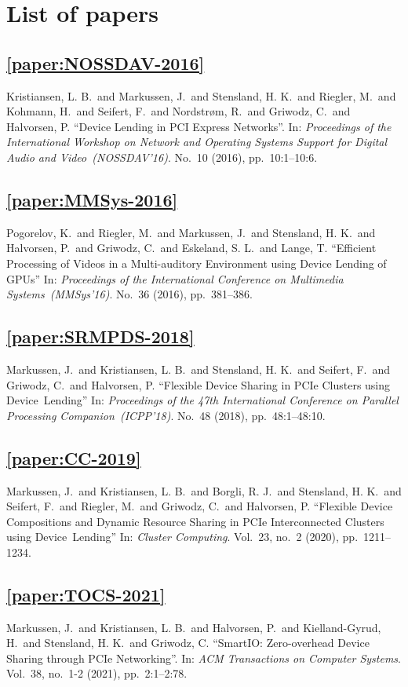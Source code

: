 \chapter{List of papers}

\section*{\cref{paper:NOSSDAV-2016}}
Kristiansen, L. B.\ and Markussen, J.\ and Stensland, H. K.\ and Riegler, M.\ and Kohmann, H.\ and Seifert, F.\ and Nordstr{\o}m, R.\ and Griwodz, C.\ and Halvorsen, P.
\enquote{Device Lending in PCI Express Networks}.
In: \emph{Proceedings of the International Workshop on Network and Operating Systems Support for Digital Audio and Video~(NOSSDAV'16)}.
No.~10 (2016),
pp.~10:1--10:6.


\section*{\cref{paper:MMSys-2016}}
Pogorelov, K.\ and Riegler, M.\ and Markussen, J.\ and Stensland, H. K.\ and Halvorsen, P.\ and Griwodz, C.\ and Eskeland, S. L.\ and Lange, T.
\enquote{Efficient Processing of Videos in a Multi-auditory Environment using Device Lending of GPUs}
In: \emph{Proceedings of the International Conference on Multimedia Systems~(MMSys'16)}.
No.~36 (2016),
pp.~381--386.


\section*{\cref{paper:SRMPDS-2018}}
Markussen, J.\ and Kristiansen, L. B.\ and Stensland, H. K.\ and Seifert, F.\ and Griwodz, C.\ and Halvorsen, P.
\enquote{Flexible Device Sharing in PCIe Clusters using Device~Lending}
In: \emph{Proceedings of the 47th International Conference on Parallel Processing Companion~(ICPP'18)}.
No.~48 (2018),
pp.~48:1--48:10.


\section*{\cref{paper:CC-2019}}
Markussen, J.\ and Kristiansen, L. B.\ and Borgli, R. J.\ and Stensland, H. K.\ and Seifert, F.\ and Riegler, M.\ and Griwodz, C.\ and Halvorsen, P.
\enquote{Flexible Device Compositions and Dynamic Resource Sharing in PCIe Interconnected Clusters using Device~Lending}
In: \emph{Cluster Computing}.
Vol.~23,
no.~2
(2020),
pp.~1211--1234.


\section*{\cref{paper:TOCS-2021}}
Markussen, J.\ and Kristiansen, L. B.\ and Halvorsen, P.\ and Kielland-Gyrud, H.\ and Stensland, H. K.\ and Griwodz, C.
\enquote{SmartIO: Zero-overhead Device Sharing through PCIe Networking}.
In: \emph{ACM Transactions on Computer Systems}.
Vol.~38,
no.~1-2
(2021),
pp.~2:1--2:78.

